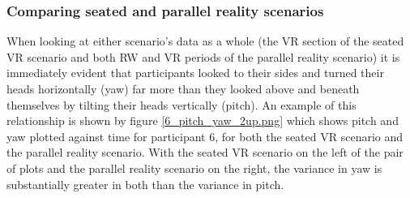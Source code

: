 

\subsubsection{Comparing seated and parallel reality scenarios}
\label{stage1-seated-vs-parallel-reality}
When looking at either scenario's data as a whole (the VR section of the seated VR scenario and both RW and VR periods of the parallel reality scenario) it is immediately evident that participants looked to their sides and turned their heads horizontally (yaw) far more than they looked above and beneath themselves by tilting their heads vertically (pitch). An example of this relationship is shown by figure \ref{6_pitch_yaw_2up.png} which shows pitch and yaw plotted against time for participant 6, for both the seated VR scenario and the parallel reality scenario. With the seated VR scenario on the left of the pair of plots and the parallel reality scenario on the right, the variance in yaw is substantially greater in both than the variance in pitch.



